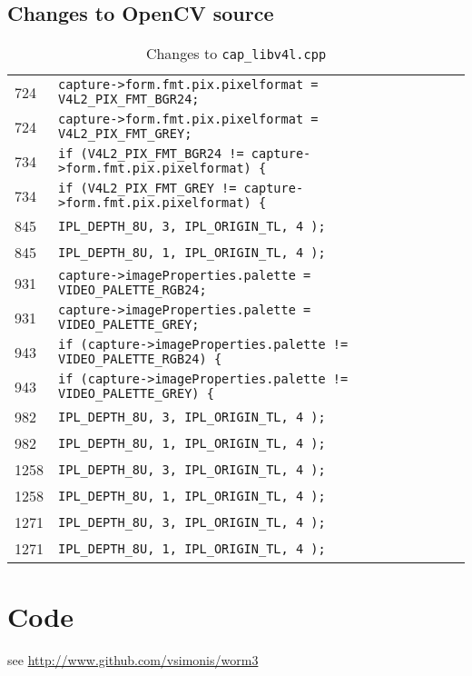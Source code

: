 \documentclass[main.tex]{subfiles}
\begin{document}
\subsection{Changes to OpenCV source}
\label{app:change}
\begin{table}[!htbp]
\begin{tabular}{|l | l | l|}
\hline
724 & \verb|capture->form.fmt.pix.pixelformat = V4L2_PIX_FMT_BGR24;| \\
724 & \verb|capture->form.fmt.pix.pixelformat = V4L2_PIX_FMT_GREY;| \\ \hline
734 & \verb|if (V4L2_PIX_FMT_BGR24 != capture->form.fmt.pix.pixelformat) {|\\
734 & \verb|if (V4L2_PIX_FMT_GREY != capture->form.fmt.pix.pixelformat) {|\\ \hline
845 & \verb|IPL_DEPTH_8U, 3, IPL_ORIGIN_TL, 4 );|\\
845 & \verb|IPL_DEPTH_8U, 1, IPL_ORIGIN_TL, 4 );|\\ \hline
931 & \verb|capture->imageProperties.palette = VIDEO_PALETTE_RGB24;| \\
931 & \verb|capture->imageProperties.palette = VIDEO_PALETTE_GREY;| \\ \hline
943 & \verb|if (capture->imageProperties.palette != VIDEO_PALETTE_RGB24) {| \\
943 & \verb|if (capture->imageProperties.palette != VIDEO_PALETTE_GREY) {| \\ \hline
982 & \verb|IPL_DEPTH_8U, 3, IPL_ORIGIN_TL, 4 );|\\
982 & \verb|IPL_DEPTH_8U, 1, IPL_ORIGIN_TL, 4 );|\\ \hline
1258 & \verb|IPL_DEPTH_8U, 3, IPL_ORIGIN_TL, 4 );|\\
1258 & \verb|IPL_DEPTH_8U, 1, IPL_ORIGIN_TL, 4 );|\\ \hline
1271 & \verb|IPL_DEPTH_8U, 3, IPL_ORIGIN_TL, 4 );|\\
1271 & \verb|IPL_DEPTH_8U, 1, IPL_ORIGIN_TL, 4 );|\\ \hline
\end{tabular}
\caption{Changes to \texttt{cap\_libv4l.cpp}}
\label{table:srcChange}
\end{table}

\section{Code}
see \url{http://www.github.com/vsimonis/worm3}
\end{document}
